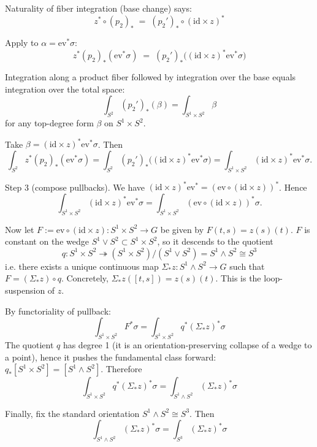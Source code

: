 \documentclass[12pt]{article}
\begin{document}
\begin{remark}
    Naturality of fiber integration (base change) says:
    \[
    z^* \circ (p_2)_* \;=\; (p_2')_*\circ (\mathrm{id}\times z)^*
    \]

    Apply to $\alpha=\mathrm{ev}^*\sigma$:
    \[
    z^*(p_2)_*(\mathrm{ev}^*\sigma) \;=\; (p_2')_*\big((\mathrm{id}\times z)^*\mathrm{ev}^*\sigma\big)
    \]

    Integration along a product fiber followed by integration over the base equals integration over the total space:
    \[
        \int_{S^2} (p_2')_*(\beta) = \int_{S^1\times S^2} \beta
    \]
    for any top-degree form $\beta$ on $S^1\times S^2$.

    Take $\beta=(\mathrm{id}\times z)^*\mathrm{ev}^*\sigma$. Then
    \[
        \int_{S^2} z^*(p_2)_*(\mathrm{ev}^*\sigma)
        = \int_{S^2} (p_2')_*\big((\mathrm{id}\times z)^*\mathrm{ev}^*\sigma\big)
        = \int_{S^1\times S^2} (\mathrm{id}\times z)^*\mathrm{ev}^*\sigma.
    \]

    Step 3 (compose pullbacks). We have $(\mathrm{id}\times z)^*\mathrm{ev}^* = (\mathrm{ev}\circ(\mathrm{id}\times z))^*$. Hence
    \[
        \int_{S^1\times S^2} (\mathrm{id}\times z)^*\mathrm{ev}^*\sigma
        = \int_{S^1\times S^2} (\mathrm{ev}\circ(\mathrm{id}\times z))^*\sigma.
    \]

    Now let $F := \mathrm{ev}\circ(\mathrm{id}\times z): S^1\times S^2 \to G$ be given by $F(t,s)=z(s)(t)$. $F$ is constant on the wedge $S^1\vee S^2\subset S^1\times S^2$, so it descends to the quotient
    \[
    q: S^1\times S^2 \twoheadrightarrow (S^1\times S^2)/(S^1\vee S^2) = S^1\wedge S^2 \cong S^3
    \]
    i.e. there exists a unique continuous map $\Sigma_* z:S^1\wedge S^2\to G$ such that $F = (\Sigma_* z)\circ q$. Concretely, $\Sigma_* z([t,s])=z(s)(t)$. This is the loop-suspension of $z$.

    By functoriality of pullback:
    \[
    \int_{S^1\times S^2} F^*\sigma = \int_{S^1\times S^2} q^*(\Sigma_* z)^*\sigma
    \]
    The quotient $q$ has degree 1 (it is an orientation-preserving collapse of a wedge to a point), hence it pushes the fundamental class forward: $q_*[S^1\times S^2]=[S^1\wedge S^2]$. Therefore
    \[
    \int_{S^1\times S^2} q^*(\Sigma_* z)^*\sigma = \int_{S^1\wedge S^2} (\Sigma_* z)^*\sigma
    \]

    Finally, fix the standard orientation $S^1\wedge S^2 \cong S^3$. Then
    \[
    \int_{S^1\wedge S^2} (\Sigma_* z)^*\sigma = \int_{S^3} (\Sigma_* z)^*\sigma
    \]
\end{remark}
\end{document}
